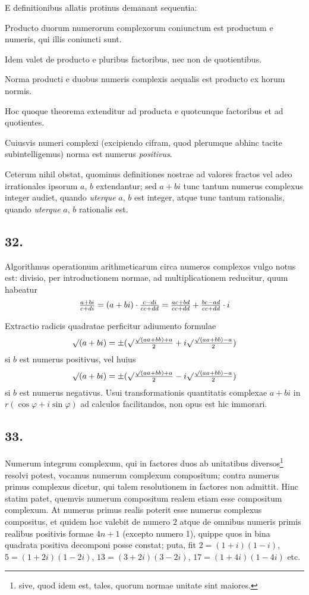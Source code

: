 \documentclass[twoside,12pt, showframe]{memoir}
\let\oldfrac\frac
\def\frac#1#2{\mathchoice{\tfrac{#1}{#2}}{\oldfrac{#1}{#2}}{\genfrac{}{}{}{2}{#1}{#2\mathstrut}}{\genfrac{}{}{}{3}{#1}{#2\mathstrut}}}
\begin{document}
E definitionibus allatis protinus demanant sequentia:
 
Producto duorum numerorum complexorum coniunctum est productum e numeris, qui illis coniuncti sunt.
 
Idem valet de producto e pluribus factoribus, nec non de quotientibus.
 
Norma producti e duobus numeris complexis aequalis est producto ex horum normis.
 
Hoc quoque theorema extenditur ad producta e quotcunque factoribus et ad quotientes.
 
Cuiusvis numeri complexi (excipiendo cifram, quod plerumque abhinc tacite subintelligemus) norma est numerus \textit{positivus}.
 
Ceterum nihil obstat, quominus definitiones nostrae ad valores fractos vel adeo irrationales ipsorum \(a\), \(b\) extendantur; sed \(a+b i\) tunc tantum numerus complexus integer audiet, quando \textit{uterque} \(a\), \(b\) est integer, atque tunc tantum rationalis, quando \textit{uterque} \(a\), \(b\) rationalis est.\clearpage\noindent%

\subsection*{32.}
 
Algorithmus operationum arithmeticarum circa numeros complexos vulgo notus est: divisio, per introductionem normae, ad multiplicationem reducitur, quum habeatur
\[\frac{a+b i}{c+d i}=(a+b i) \cdot \frac{c-d i}{c c+d d}=\frac{a c+b d}{c c+d d}+\frac{b c-a d}{c c+d d} \cdot i\]
 
Extractio radicis quadratae perficitur adiumento formulae
\[\surd(a+b i)= \pm(\surd \frac{\surd(a a+b b)+a}{2}+i \surd \frac{\surd(a a+b b)-a}{2})\]
si \(b\) est numerus positivus, vel huius
\[\surd(a+b i)= \pm(\surd \frac{\surd(a a+b b)+a}{2}-i \surd \frac{\surd(a a+b b)-a}{2})\]
si \(b\) est numerus negativus. Usui transformationis quantitatis complexae \(a+b i\) in \(r(\cos \varphi+i \sin \varphi)\) ad calculos facilitandos, non opus est hic immorari.

\subsection*{33.}
 
Numerum integrum complexum, qui in factores duos ab unitatibus diversos\footnote{sive, quod idem est, tales, quorum normae unitate sint maiores.} resolvi potest, vocamus numerum complexum compositum; contra numerus primus complexus dicetur, qui talem resolutionem in factores non admittit. Hinc statim patet, quemvis numerum compositum realem etiam esse compositum complexum. At numerus primus realis poterit esse numerus complexus compositus, et quidem hoc valebit de numero \(2\) atque de omnibus numeris primis realibus positivis formae \(4 n+1\) (excepto numero 1), quippe quos in bina quadrata positiva decomponi posse constat; puta, fit \(2=(1+i)(1-i)\), \(5=(1+2 i)(1-2 i)\), \(13=(3+2 i)(3-2 i)\), \(17=(1+4 i)(1-4 i)\) etc.
 
\end{document}
